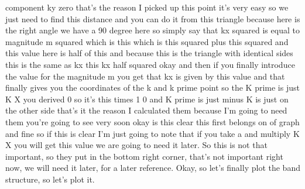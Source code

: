 component ky zero that's the reason I picked up this point it's very easy so we just need to find this distance and you can do it from this triangle because here is the right angle we have a 90 degree here so simply say that kx squared is equal to magnitude m squared which is this which is this squared plus this squared and this value here is half of this and because this is the triangle with identical sides this is the same as kx this kx half squared okay and then if you finally introduce the value for the magnitude m you get that kx is given by this value and that finally gives you the coordinates of the k and k prime point so the K prime is just K X you derived 0 so it's this times 1 0 and K prime is just minus K is just on the other side that's it the reason I calculated them because I'm going to need them you're going to see very soon okay is this clear this first belongs on of graph and fine so if this is clear I'm just going to note that if you take a and multiply K X you will get this value we are going to need it later. So this is not that important, so they put in the bottom right corner, that's not important right now, we will need it later, for a later reference. Okay, so let's finally plot the band structure, so let's plot it.

